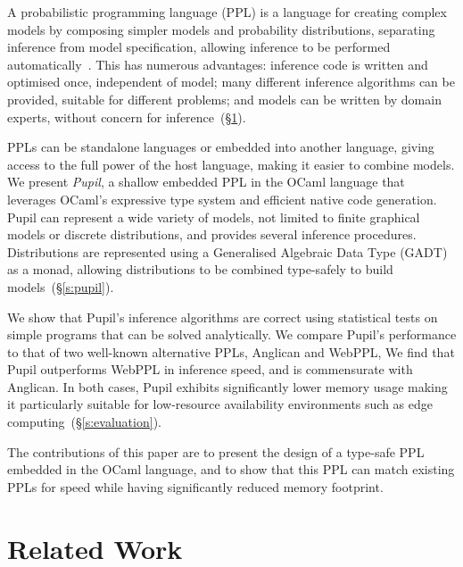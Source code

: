\documentclass[sigconf]{acmart}
\newcommand{\s}[1]{(\S\ref{#1})}
\newcommand{\pupil}{Pupil\xspace}
\begin{document}
A probabilistic programming language (PPL) is a language for creating complex models by composing simpler models and probability distributions, separating inference from model specification, allowing inference to be performed automatically~\cite{gordon2014probabilistic}. This has numerous advantages: inference code is written and optimised once, independent of model; many different inference algorithms can be provided, suitable for different problems; and models can be written by domain experts, without concern for inference~\s{s:related}.

PPLs can be standalone languages or embedded into another language, giving access to the full power of the host language, making it easier to combine models. We present \emph{\pupil}, a shallow embedded PPL in the OCaml language that leverages OCaml's expressive type system and efficient native code generation. \pupil can represent a wide variety of models, not limited to finite graphical models or discrete distributions, and provides several inference procedures. Distributions are represented using a Generalised Algebraic Data Type (GADT) as a monad, allowing distributions to be combined type-safely to build models~\s{s:pupil}.

We show that \pupil's inference algorithms are correct using statistical tests on simple programs that can be solved analytically. We compare \pupil's performance to that of two well-known alternative PPLs, Anglican and WebPPL, We find that \pupil outperforms WebPPL in inference speed, and is commensurate with Anglican. In both cases, \pupil exhibits significantly lower memory usage making it particularly suitable for low-resource availability environments such as edge computing~\s{s:evaluation}.

The contributions of this paper are to present the design of a type-safe PPL embedded in the OCaml language, and to show that this PPL can match existing PPLs for speed while having significantly reduced memory footprint.

\section{Related Work}
\label{s:related}
\end{document}
